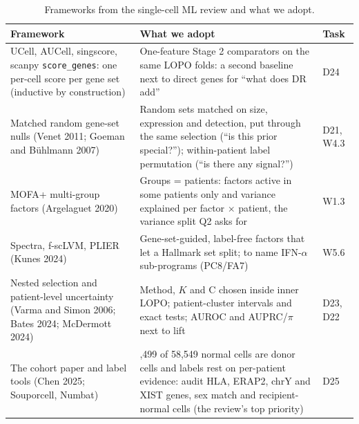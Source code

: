 \begin{table}[H]
\centering
\small
\caption{Frameworks from the single-cell ML review and what we adopt.}
\label{tab:09lit}
\begin{tabularx}{\linewidth}{>{\raggedright\arraybackslash}p{4.4cm} >{\raggedright\arraybackslash}X >{\raggedright\arraybackslash}p{1.4cm}}
\toprule
Framework & What we adopt & Task \\
\midrule
UCell, AUCell, singscore, scanpy \texttt{score\_genes}: one per-cell score per gene set (inductive by construction) & One-feature Stage 2 comparators on the same LOPO folds: a second baseline next to direct genes for ``what does DR add'' & D24 \\
Matched random gene-set nulls (Venet 2011; Goeman and B\"uhlmann 2007) & Random sets matched on size, expression and detection, put through the same selection (``is this prior special?''); within-patient label permutation (``is there any signal?'') & D21, W4.3 \\
MOFA+ multi-group factors (Argelaguet 2020) & Groups = patients: factors active in some patients only and variance explained per factor $\times$ patient, the variance split Q2 asks for & W1.3 \\
Spectra, f-scLVM, PLIER (Kunes 2024) & Gene-set-guided, label-free factors that let a Hallmark set split; to name IFN-$\alpha$ sub-programs (PC8/FA7) & W5.6 \\
Nested selection and patient-level uncertainty (Varma and Simon 2006; Bates 2024; McDermott 2024) & Method, $K$ and C chosen inside inner LOPO; patient-cluster intervals and exact tests; AUROC and AUPRC/$\pi$ next to lift & D23, D22 \\
The cohort paper and label tools (Chen 2025; Souporcell, Numbat) & 58,499 of 58,549 normal cells are donor cells and labels rest on per-patient evidence: audit HLA, ERAP2, chrY and XIST genes, sex match and recipient-normal cells (the review's top priority) & D25 \\
\bottomrule
\end{tabularx}
\end{table}

